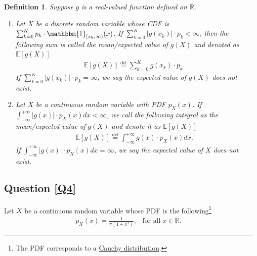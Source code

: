 \documentclass[11pt,letterpaper, leqno]{article}
\newtheorem{definition}{Definition}
\numberwithin{equation}{section}
\numberwithin{theorem}{section}
\numberwithin{lemma}{section}
\numberwithin{corollary}{section}
\numberwithin{definition}{section}
\numberwithin{proposition}{section}
\numberwithin{remark}{section}
\numberwithin{example}{section}
\begin{document}
\begin{definition}\label{def: LOTUS}
Suppose $g$ is a real-valued function defined on $\mathbb{R}$.
    \begin{enumerate}
        \item Let $X$ be a discrete random variable whose CDF is $\sum_{k=0}^K p_k\cdot\mathbbm{1}_{[x_k,\infty)}(x)$. If $\sum_{k=0}^K \vert g(x_k)\vert \cdot p_k<\infty$, then the following sum is called the mean/expected value of $g(X)$ and denoted as $\mathbb{E}[g(X)]$
    \begin{align*}
        \boxed{\mathbb{E}\left[g(X)\right] \operatorname{\overset{\operatorname{def}}{=}} \sum_{k=0}^K g(x_k)\cdot p_k.}
    \end{align*}
    If $\sum_{k=0}^K \vert g(x_k)\vert \cdot p_k=\infty$, we say the expected value of $g(X)$ does not exist.

    \item Let $X$ be a continuous random variable with PDF $p_X(x)$. If $\int_{-\infty}^{+\infty} \vert g(x)\vert\cdot p_X(x)dx<\infty$, we call the following integral as the mean/expected value of $g(X)$ and denote it as $\mathbb{E}[g(X)]$
    \begin{align*}
        \boxed{\mathbb{E}[g(X)]\operatorname{\overset{\operatorname{def}}{=}} \int_{-\infty}^{+\infty} g(x)\cdot p_X(x)dx.}
    \end{align*}
    If $\int_{-\infty}^{+\infty} \vert g(x)\vert\cdot p_X(x)dx=\infty$, we say the expected value of $X$ does not exist.
    \end{enumerate}
\end{definition}

\subsection{Question \ref{Q4}}

Let $X$ be a continuous random variable whose PDF is the following\footnote{The PDF corresponds to a \href{https://en.wikipedia.org/wiki/Cauchy_distribution}{Cauchy distribution}.}
\begin{align}\label{eq: continuous Cauchy distribution}
    p_X(x)=\frac{1}{\pi\left(1+x^2\right)},\ \ \text{ for all }x\in\mathbb{R}.
\end{align}
\end{document}
